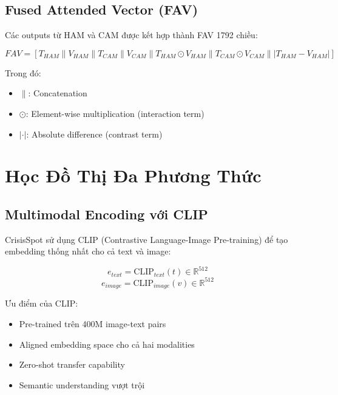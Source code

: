 \documentclass[12pt,a4paper]{article}
\begin{document}
\subsection{Fused Attended Vector (FAV)}

Các outputs từ HAM và CAM được kết hợp thành FAV 1792 chiều:

\begin{equation}
FAV = [T_{HAM} \| V_{HAM} \| T_{CAM} \| V_{CAM} \| T_{HAM} \odot V_{HAM} \| T_{CAM} \odot V_{CAM} \| |T_{HAM} - V_{HAM}|]
\label{eq:fav}
\end{equation}

Trong đó:
\begin{itemize}
    \item $\|$: Concatenation
    \item $\odot$: Element-wise multiplication (interaction term)
    \item $|\cdot|$: Absolute difference (contrast term)
\end{itemize}

\section{Học Đồ Thị Đa Phương Thức}

\subsection{Multimodal Encoding với CLIP}

CrisisSpot sử dụng CLIP (Contrastive Language-Image Pre-training) để tạo embedding thống nhất cho cả text và image:

\begin{equation}
e_{text} = \text{CLIP}_{text}(t) \in \mathbb{R}^{512}
\end{equation}
\begin{equation}
e_{image} = \text{CLIP}_{image}(v) \in \mathbb{R}^{512}
\end{equation}

Ưu điểm của CLIP:
\begin{itemize}
    \item Pre-trained trên 400M image-text pairs
    \item Aligned embedding space cho cả hai modalities
    \item Zero-shot transfer capability
    \item Semantic understanding vượt trội
\end{itemize}
\end{document}
